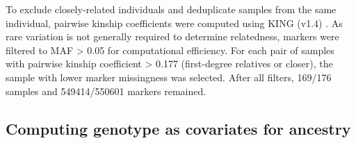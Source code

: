 To exclude closely-related individuals and deduplicate samples from the same individual, 
pairwise kinship coefficients were computed using KING (v1.4) \autocite{manichaikul2010RobustRelationshipInference}.
As rare variation is not generally required to determine relatedness, 
markers were filtered to \gls{MAF} \num{> 0.05} for computational efficiency.
For each pair of samples with pairwise kinship coefficient \num{> 0.177} (first-degree relatives or closer), the sample with lower marker missingness was selected.
After all filters, 169/176 samples and \num{549414/550601} markers remained.

\subsection{Computing genotype  as covariates for ancestry}
\label{subsec:hird_dge_genotype_pc}

